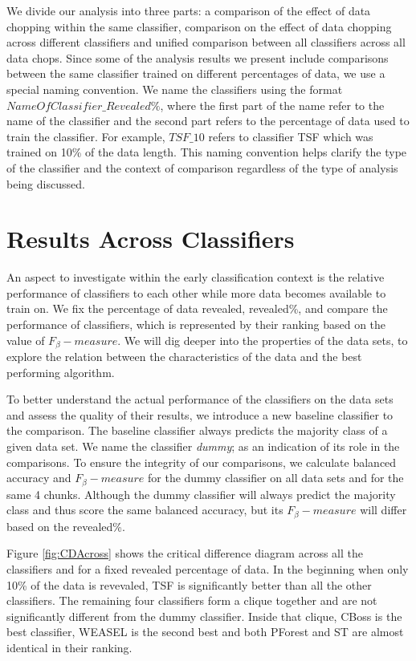 We divide our analysis into three parts: a comparison of the effect of data chopping within the same classifier,
comparison on the effect of data chopping across different classifiers and unified comparison between all classifiers
across all data chops.
Since some of the analysis results we present include comparisons between the same classifier trained on different percentages of data, we use a special naming convention.
We name the classifiers using the format $NameOfClassifier\_Revealed\%$, where the first part of the name refer to the name of the classifier
and the second part refers to the percentage of data used to train the classifier. For example, $TSF\_10$ refers to classifier TSF which was trained on 10\% of the data length.
This naming convention helps clarify the type of the classifier and the context of comparison regardless of the type of analysis being discussed.


\section{Results Across Classifiers}
\label{SectionAcrossComparison}
An aspect to investigate within the early classification context is the relative performance of classifiers to each other while more data becomes available to train on.
We fix the percentage of data revealed, revealed\%, and compare the performance of classifiers, which is represented by their ranking based on the value of $F_{\beta}-measure$.
We will dig deeper into the properties of the data sets, to explore the relation between the characteristics of the data and the best performing algorithm.

To better understand the actual performance of the classifiers on the data sets and assess the quality of their results, we introduce a new baseline classifier to the comparison.
The baseline classifier always predicts the majority class of a given data set.
We name the classifier \emph{dummy}; as an indication of its role in the comparisons.
To ensure the integrity of our comparisons, we calculate balanced accuracy and $F_{\beta}-measure$ for the dummy classifier on all data sets and for the same 4 chunks.
Although the dummy classifier will always predict the majority class and thus score the same balanced accuracy, but its $F_{\beta}-measure$ will differ based on the revealed\%.

Figure \ref{fig:CDAcross} shows the critical difference diagram across all the classifiers and for a fixed revealed percentage of data.
In the beginning when only 10\% of the data is revevaled, TSF is significantly better than all the other classifiers.
The remaining four classifiers form a clique together and are not significantly different from the dummy classifier.
Inside that clique, CBoss is the best classifier, WEASEL is the second best and both PForest and ST are almost identical in their ranking.


